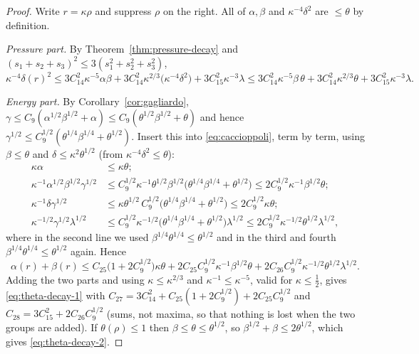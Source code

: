 \documentclass[11pt,reqno]{amsart}
\begin{document}
\begin{proof}
Write $r=\kappa\rho$ and suppress $\rho$ on the right. All of $\alpha,\beta$ and
$\kappa^{-4}\delta^{2}$ are $\le\theta$ by definition.

\emph{Pressure part.} By Theorem~\ref{thm:pressure-decay} and
$(s_{1}+s_{2}+s_{3})^{2}\le3(s_{1}^{2}+s_{2}^{2}+s_{3}^{2})$,
\[
  \kappa^{-4}\delta(r)^{2}
  \le3C_{14}^{2}\kappa^{-5}\alpha\beta
   +3C_{14}^{2}\kappa^{2/3}\bigl(\kappa^{-4}\delta^{2}\bigr)
   +3C_{15}^{2}\kappa^{-3}\lambda
  \le3C_{14}^{2}\kappa^{-5}\beta\,\theta+3C_{14}^{2}\kappa^{2/3}\theta
   +3C_{15}^{2}\kappa^{-3}\lambda .
\]

\emph{Energy part.} By Corollary~\ref{cor:gagliardo},
$\gamma\le C_{9}(\alpha^{1/2}\beta^{1/2}+\alpha)\le C_{9}(\theta^{1/2}\beta^{1/2}+\theta)$
and hence
$\gamma^{1/2}\le C_{9}^{1/2}(\theta^{1/4}\beta^{1/4}+\theta^{1/2})$. Insert this
into \eqref{eq:caccioppoli}, term by term, using $\beta\le\theta$ and
$\delta\le\kappa^{2}\theta^{1/2}$ (from $\kappa^{-4}\delta^{2}\le\theta$):
\[
\begin{aligned}
  \kappa\alpha&\le\kappa\theta;\\
  \kappa^{-1}\alpha^{1/2}\beta^{1/2}\gamma^{1/2}
    &\le C_{9}^{1/2}\kappa^{-1}\theta^{1/2}\beta^{1/2}
      \bigl(\theta^{1/4}\beta^{1/4}+\theta^{1/2}\bigr)
    \le2C_{9}^{1/2}\kappa^{-1}\beta^{1/2}\theta;\\
  \kappa^{-1}\delta\gamma^{1/2}
    &\le\kappa\theta^{1/2}\,C_{9}^{1/2}\bigl(\theta^{1/4}\beta^{1/4}+\theta^{1/2}\bigr)
    \le2C_{9}^{1/2}\kappa\theta;\\
  \kappa^{-1/2}\gamma^{1/2}\lambda^{1/2}
    &\le C_{9}^{1/2}\kappa^{-1/2}\bigl(\theta^{1/4}\beta^{1/4}+\theta^{1/2}\bigr)\lambda^{1/2}
    \le2C_{9}^{1/2}\kappa^{-1/2}\theta^{1/2}\lambda^{1/2},
\end{aligned}
\]
where in the second line we used $\beta^{1/4}\theta^{1/4}\le\theta^{1/2}$ and in
the third and fourth $\beta^{1/4}\theta^{1/4}\le\theta^{1/2}$ again. Hence
\[
  \alpha(r)+\beta(r)\le
    C_{25}\bigl(1+2C_{9}^{1/2}\bigr)\kappa\theta
   +2C_{25}C_{9}^{1/2}\kappa^{-1}\beta^{1/2}\theta
   +2C_{26}C_{9}^{1/2}\kappa^{-1/2}\theta^{1/2}\lambda^{1/2}.
\]
Adding the two parts and using $\kappa\le\kappa^{2/3}$ and
$\kappa^{-1}\le\kappa^{-5}$, valid for $\kappa\le\tfrac12$, gives
\eqref{eq:theta-decay-1} with
$C_{27}=3C_{14}^{2}+C_{25}(1+2C_{9}^{1/2})+2C_{25}C_{9}^{1/2}$ and
$C_{28}=3C_{15}^{2}+2C_{26}C_{9}^{1/2}$ (sums, not maxima, so that nothing is
lost when the two groups are added). If $\theta(\rho)\le1$ then
$\beta\le\theta\le\theta^{1/2}$, so
$\beta^{1/2}+\beta\le2\theta^{1/2}$, which gives \eqref{eq:theta-decay-2}.
\end{proof}
\end{document}
